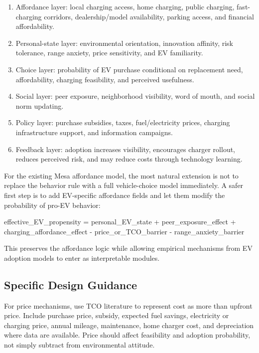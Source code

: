 \documentclass[
]{article}
\newenvironment{Shaded}{}{}
\newcommand{\NormalTok}[1]{#1}
\providecommand{\tightlist}{%
  \setlength{\itemsep}{0pt}\setlength{\parskip}{0pt}}
\begin{document}
\begin{enumerate}
\def\labelenumi{\arabic{enumi}.}
\tightlist
\item
  Affordance layer: local charging access, home charging, public
  charging, fast-charging corridors, dealership/model availability,
  parking access, and financial affordability.
\item
  Personal-state layer: environmental orientation, innovation affinity,
  risk tolerance, range anxiety, price sensitivity, and EV familiarity.
\item
  Choice layer: probability of EV purchase conditional on replacement
  need, affordability, charging feasibility, and perceived usefulness.
\item
  Social layer: peer exposure, neighborhood visibility, word of mouth,
  and social norm updating.
\item
  Policy layer: purchase subsidies, taxes, fuel/electricity prices,
  charging infrastructure support, and information campaigns.
\item
  Feedback layer: adoption increases visibility, encourages charger
  rollout, reduces perceived risk, and may reduce costs through
  technology learning.
\end{enumerate}

For the existing Mesa affordance model, the most natural extension is
not to replace the behavior rule with a full vehicle-choice model
immediately. A safer first step is to add EV-specific affordance fields
and let them modify the probability of pro-EV behavior:

\begin{Shaded}
\begin{Highlighting}[]
\NormalTok{effective\_EV\_propensity =}
\NormalTok{    personal\_EV\_state}
\NormalTok{    + peer\_exposure\_effect}
\NormalTok{    + charging\_affordance\_effect}
\NormalTok{    {-} price\_or\_TCO\_barrier}
\NormalTok{    {-} range\_anxiety\_barrier}
\end{Highlighting}
\end{Shaded}

This preserves the affordance logic while allowing empirical mechanisms
from EV adoption models to enter as interpretable modules.

\subsection{Specific Design Guidance}\label{specific-design-guidance}

For price mechanisms, use TCO literature to represent cost as more than
upfront price. Include purchase price, subsidy, expected fuel savings,
electricity or charging price, annual mileage, maintenance, home charger
cost, and depreciation where data are available. Price should affect
feasibility and adoption probability, not simply subtract from
environmental attitude.
\end{document}

